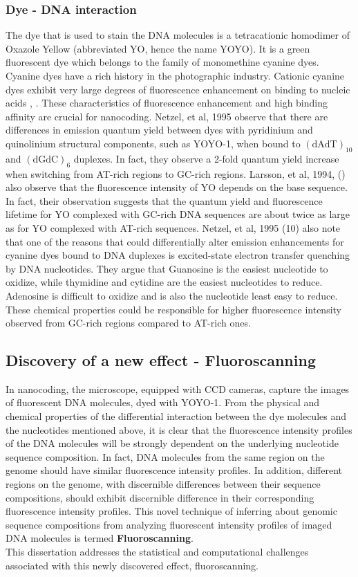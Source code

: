 \subsubsection*{Dye - DNA interaction} 
The dye that is used to stain the DNA molecules is a tetracationic homodimer of Oxazole Yellow (abbreviated YO, hence the name YOYO). It is a green fluorescent dye which belongs to the family of monomethine cyanine dyes. Cyanine dyes have a rich history in the photographic industry. Cationic  cyanine dyes  exhibit very large degrees of fluorescence enhancement on binding to nucleic acids \cite{Rye_etal_1992_NAR}, \cite{Lee_etal_1986_Cytometry}. These  characteristics of fluorescence enhancement and  high binding affinity are crucial for nanocoding. Netzel, et al, 1995 \cite{Netzel_etal_1995_JPC} observe that there are differences in emission quantum yield between dyes with pyridinium and quinolinium structural components, such as YOYO-1, when bound to $(\text{dAdT})_{10}$ and $(\text{dGdC})_6$ duplexes. In fact, they observe a 2-fold quantum yield increase when switching from AT-rich regions to GC-rich regions. Larsson, et al, 1994, (\cite{Larsson_etal_1994_JACS}) also observe that the fluorescence intensity of YO depends on the base sequence. In fact, their observation suggests that the quantum yield and fluorescence lifetime for YO complexed with GC-rich DNA sequences are about twice as large as for YO complexed with AT-rich sequences. Netzel, et al, 1995 (10) also note that one of the reasons that could differentially alter emission enhancements for cyanine dyes bound to DNA  duplexes is excited-state electron transfer quenching by DNA nucleotides. They argue that Guanosine is the easiest nucleotide to oxidize, while thymidine and cytidine are the easiest nucleotides to reduce. Adenosine is difficult to oxidize and is also the nucleotide least easy to reduce. These chemical properties could be responsible for higher fluorescence intensity observed from GC-rich regions compared to AT-rich ones. 

\subsection{Discovery of a new effect - Fluoroscanning}
In nanocoding, the microscope, equipped with CCD cameras, capture the images of fluorescent DNA molecules, dyed with YOYO-1. From the physical and chemical properties of the differential interaction between the dye molecules and the nucleotides mentioned above, it is clear that the fluorescence intensity profiles of the DNA molecules will be strongly dependent on the underlying nucleotide sequence composition. In fact, DNA molecules from the same region on the genome should have similar fluorescence intensity profiles. In addition, different regions on the genome, with discernible differences between their sequence compositions, should exhibit discernible difference in their corresponding fluorescence intensity profiles. This novel technique of inferring about genomic sequence compositions from analyzing fluorescent intensity profiles of imaged DNA molecules is termed {\bf{Fluoroscanning}}. \\

This dissertation addresses the statistical and computational challenges associated with this newly discovered effect, fluoroscanning. 


